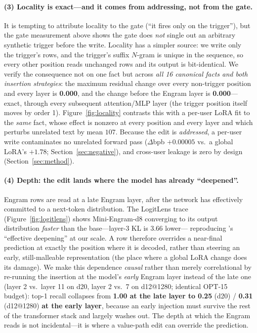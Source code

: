 \documentclass[letterpaper]{article} %
\begin{document}
\paragraph{(3) Locality is exact---and it comes from addressing, not
from the gate.} It is tempting to attribute locality to the gate
(``it fires only on the trigger''), but the gate measurement above
shows the gate does \emph{not} single out an arbitrary synthetic
trigger before the write. Locality has a simpler source: we write
only the trigger's rows, and the trigger's suffix $N$-gram is unique
in the sequence, so every other position reads unchanged rows and its
output is bit-identical. We verify the consequence not on one fact but
across \emph{all 16 canonical facts and both insertion strategies}:
the maximum residual change over every
non-trigger position and every layer is \textbf{0.000}, and the change
before the Engram layer is \textbf{0.000}---exact, through every
subsequent attention/MLP layer (the trigger position itself moves by
order 1). Figure~\ref{fig:locality} contrasts this with a per-user
LoRA fit to the \emph{same} fact, whose effect is nonzero at every
position and every layer and which perturbs unrelated text by mean
$107$. Because the edit is \emph{addressed}, a per-user write
contaminates no unrelated forward pass ($\Delta$bpb $+0.00005$ vs.\ a
global LoRA's $+1.78$; Section~\ref{sec:negative}), and cross-user
leakage is zero by design (Section~\ref{sec:method}).

\paragraph{(4) Depth: the edit lands where the model has already
``deepened''.} Engram rows are read at a late Engram layer, after
the network has effectively committed to a next-token
distribution. The LogitLens trace (Figure~\ref{fig:logitlens})
shows Mini-Engram-d8 converging to its output distribution
\emph{faster} than the base---layer-3 KL is 3.66 lower---%
reproducing \citeauthor{cheng2026engram}'s ``effective deepening'' at our scale.
A row therefore overrides a near-final prediction at exactly the
position where it is decoded, rather than steering an early,
still-malleable representation (the place where a global LoRA
change does its damage). We make this dependence \emph{causal}
rather than merely correlational by re-running the insertion at the
model's \emph{early} Engram layer instead of the late one (layer 2
vs.\ layer 11 on d20, layer 2 vs.\ 7 on d12@1280; identical OPT-15
budget): top-1 recall collapses from
\textbf{1.00 at the late layer to 0.25} (d20) / \textbf{0.31}
(d12@1280) \textbf{at the early layer}, because an early injection
must survive the rest of the transformer stack and largely washes
out. The depth at which the Engram reads is not incidental---it is
where a value-path edit can override the prediction.
\end{document}

